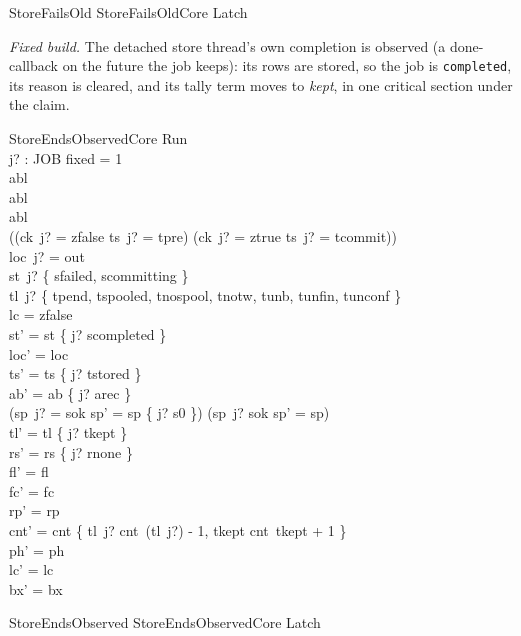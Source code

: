 \documentclass[a4paper,10pt,fleqn]{article}
\newcommand{\field}[1]{\texttt{#1}}
\begin{document}
\begin{zed}
StoreFailsOld  StoreFailsOldCore \land Latch
\end{zed}

\emph{Fixed build.} The detached store thread's own completion is observed (a
done-callback on the future the job keeps): its rows are stored, so the job is
\field{completed}, its reason is cleared, and its tally term moves to
\emph{kept}, in one critical section under the claim.

\begin{schema}{StoreEndsObservedCore}
\Delta Run \\ j? : JOB
\where
fixed = 1 \\
abl  \\
abl  \\
abl  \\
((ck~j? = zfalse \land ts~j? = tpre) \lor (ck~j? = ztrue \land ts~j? = tcommit)) \\
loc~j? = out \\
st~j? \in \{ sfailed, scommitting \} \\
tl~j? \in \{ tpend, tspooled, tnospool, tnotw, tunb, tunfin, tunconf \} \\
lc = zfalse \\
st' = st \oplus \{ j? \mapsto scompleted \} \\
loc' = loc \\
ts' = ts \oplus \{ j? \mapsto tstored \} \\
ab' = ab \oplus \{ j? \mapsto arec \} \\
(sp~j? = sok \implies sp' = sp \oplus \{ j? \mapsto s0 \}) \land (sp~j? \neq sok \implies sp' = sp) \\
tl' = tl \oplus \{ j? \mapsto tkept \} \\
rs' = rs \oplus \{ j? \mapsto rnone \} \\
fl' = fl \\
fc' = fc \\
rp' = rp \\
cnt' = cnt \oplus \{ tl~j? \mapsto cnt~(tl~j?) - 1, tkept \mapsto cnt~tkept + 1 \} \\
ph' = ph \\
lc' = lc \\
bx' = bx
\end{schema}

\begin{zed}
StoreEndsObserved  StoreEndsObservedCore \land Latch
\end{zed}
\end{document}

